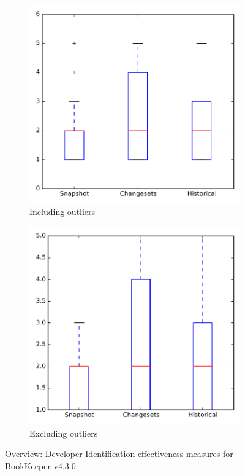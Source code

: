 
\begin{figure}
    \centering
    \begin{subfigure}{.4\textwidth}
        \centering
        \includegraphics[height=0.4\textheight]{figures/dit/all_bookkeeper}
        \caption{Including outliers}\label{fig:dit:all:bookkeeper_outlier}
    \end{subfigure}%
    \begin{subfigure}{.4\textwidth}
        \centering
        \includegraphics[height=0.4\textheight]{figures/dit/all_bookkeeper_no_outlier}
        \caption{Excluding outliers}\label{fig:dit:all:bookkeeper_no_outlier}
    \end{subfigure}
\caption{Overview: Developer Identification effectiveness measures for BookKeeper v4.3.0}
\label{fig:dit:all:bookkeeper}
\end{figure}
